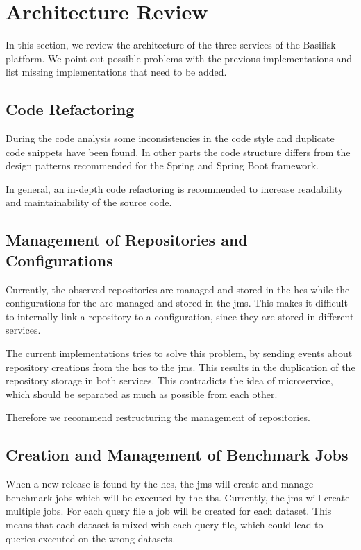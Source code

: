 \section{Architecture Review}
\label{sec:architecture_review}

In this section, we review the architecture of the three services of the Basilisk platform.
We point out possible problems with the previous implementations and list missing implementations that need to be added.


\subsection{Code Refactoring}
\label{sec:code_refactor}
During the code analysis some inconsistencies in the code style and duplicate code snippets have been found.
In other parts the code structure differs from the design patterns recommended for the Spring and Spring Boot framework.

In general, an in-depth code refactoring is recommended to increase readability and maintainability of the source code. 


\subsection{Management of Repositories and Configurations}
\label{sec:management_repo_config}
Currently, the observed repositories are managed and stored in the \ac{hcs} while the configurations for the \tsp{} are managed and stored in the \ac{jms}.
This makes it difficult to internally link a repository to a \ts{} configuration, since they are stored in different services.

The current implementations tries to solve this problem, by sending events about repository creations from the \ac{hcs} to the \ac{jms}.
This results in the duplication of the repository storage in both services.
This contradicts the idea of microservice, which should be separated as much as possible from each other.

Therefore we recommend restructuring the management of repositories.


\subsection{Creation and Management of Benchmark Jobs}
\label{sec:creation_of_benchmark_jobs}
When a new release is found by the \ac{hcs}, the \acl{jms} will create and manage benchmark jobs which will be executed by the \ac{tbs}.
Currently, the \ac{jms} will create multiple jobs.
For each query file a job will be created for each dataset.
This means that each dataset is mixed with each query file, which could lead to queries executed on the wrong datasets.

